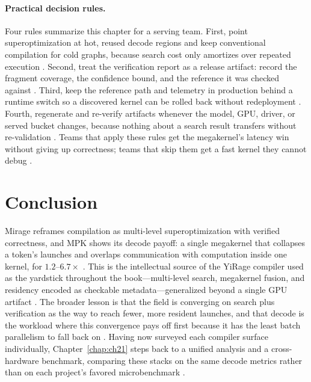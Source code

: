 \paragraph{Practical decision rules.}
Four rules summarize this chapter for a serving team. First, point superoptimization at hot, reused decode regions and keep conventional compilation for cold graphs, because search cost only amortizes over repeated execution \citep{wu2024mirage,kwon2023vllm}. Second, treat the verification report as a release artifact: record the fragment coverage, the confidence bound, and the reference it was checked against \citep{wu2024mirage,patel2025llminference}. Third, keep the reference path and telemetry in production behind a runtime switch so a discovered kernel can be rolled back without redeployment \citep{mpk2025,memoryfloor2026}. Fourth, regenerate and re-verify artifacts whenever the model, GPU, driver, or served bucket changes, because nothing about a search result transfers without re-validation \citep{wu2024mirage,nvidia2022hopper}. Teams that apply these rules get the megakernel's latency win without giving up correctness; teams that skip them get a fast kernel they cannot debug \citep{taxbreak2026,memoryfloor2026}.

\section{Conclusion}
\label{sec:ch20_conclusion}

Mirage reframes compilation as multi-level superoptimization with verified correctness, and MPK shows its decode payoff: a single megakernel that collapses a token's launches and overlaps communication with computation inside one kernel, for $1.2$--$6.7\times$ \citep{wu2024mirage,mpk2025}. This is the intellectual source of the YiRage compiler used as the yardstick throughout the book---multi-level search, megakernel fusion, and residency encoded as checkable metadata---generalized beyond a single GPU artifact \citep{yirage2026,taxbreak2026}. The broader lesson is that the field is converging on search plus verification as the way to reach fewer, more resident launches, and that decode is the workload where this convergence pays off first because it has the least batch parallelism to fall back on \citep{wu2024mirage,taxbreak2026}. Having now surveyed each compiler surface individually, Chapter~\ref{chap:ch21} steps back to a unified analysis and a cross-hardware benchmark, comparing these stacks on the same decode metrics rather than on each project's favored microbenchmark \citep{memoryfloor2026,dlbook}.

